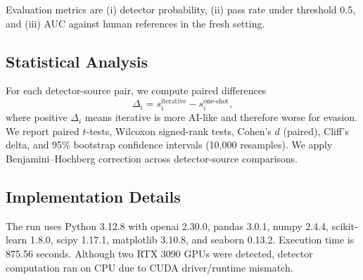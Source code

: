 Evaluation metrics are (i) detector probability, (ii) pass rate under threshold 0.5, and (iii) AUC against \hcthree human references in the fresh setting.

\subsection{Statistical Analysis}
For each detector-source pair, we compute paired differences
\[
\Delta_i = s^{\text{iterative}}_i - s^{\text{one-shot}}_i,
\]
where positive $\Delta_i$ means iterative is more AI-like and therefore worse for evasion. We report paired $t$-tests, Wilcoxon signed-rank tests, Cohen's $d$ (paired), Cliff's delta, and 95\% bootstrap confidence intervals (10{,}000 resamples). We apply Benjamini--Hochberg correction across detector-source comparisons.

\subsection{Implementation Details}
The run uses Python 3.12.8 with openai 2.30.0, pandas 3.0.1, numpy 2.4.4, scikit-learn 1.8.0, scipy 1.17.1, matplotlib 3.10.8, and seaborn 0.13.2. Execution time is 875.56 seconds. Although two RTX 3090 GPUs were detected, detector computation ran on CPU due to CUDA driver/runtime mismatch.
